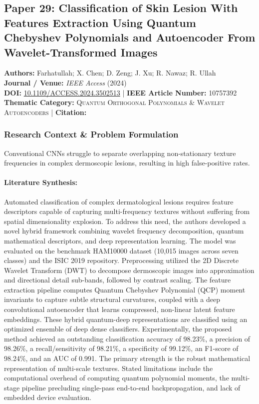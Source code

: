 \subsection{Paper 29: Classification of Skin Lesion With Features Extraction Using Quantum Chebyshev Polynomials and Autoencoder From Wavelet-Transformed Images}
\label{sec:paper_29}

\begin{tcolorbox}[colback=gray!5!white,colframe=gray!75!black,title=\textbf{Metadata \& Citation Summary}]
\textbf{Authors:} Farhatullah; X. Chen; D. Zeng; J. Xu; R. Nawaz; R. Ullah \\
\textbf{Journal / Venue:} \textit{IEEE Access} (2024) \\
\textbf{DOI:} \href{https://doi.org/10.1109/ACCESS.2024.3502513}{10.1109/ACCESS.2024.3502513} \quad | \quad \textbf{IEEE Article Number:} 10757392 \\
\textbf{Thematic Category:} \textsc{Quantum Orthogonal Polynomials \& Wavelet Autoencoders} \quad | \quad \textbf{Citation:} \cite{10757392}
\end{tcolorbox}

\subsubsection*{Research Context \& Problem Formulation}
Conventional CNNs struggle to separate overlapping non-stationary texture frequencies in complex dermoscopic lesions, resulting in high false-positive rates.

\paragraph{Literature Synthesis:} Automated classification of complex dermatological lesions requires feature descriptors capable of capturing multi-frequency textures without suffering from spatial dimensionality explosion. To address this need, the authors developed a novel hybrid framework combining wavelet frequency decomposition, quantum mathematical descriptors, and deep representation learning. The model was evaluated on the benchmark HAM10000 dataset (10,015 images across seven classes) and the ISIC 2019 repository. Preprocessing utilized the 2D Discrete Wavelet Transform (DWT) to decompose dermoscopic images into approximation and directional detail sub-bands, followed by contrast scaling. The feature extraction pipeline computes Quantum Chebyshev Polynomial (QCP) moment invariants to capture subtle structural curvatures, coupled with a deep convolutional autoencoder that learns compressed, non-linear latent feature embeddings. These hybrid quantum-deep representations are classified using an optimized ensemble of deep dense classifiers. Experimentally, the proposed method achieved an outstanding classification accuracy of 98.23\%, a precision of 98.26\%, a recall/sensitivity of 98.21\%, a specificity of 99.12\%, an F1-score of 98.24\%, and an AUC of 0.991. The primary strength is the robust mathematical representation of multi-scale textures. Stated limitations include the computational overhead of computing quantum polynomial moments, the multi-stage pipeline precluding single-pass end-to-end backpropagation, and lack of embedded device evaluation.

